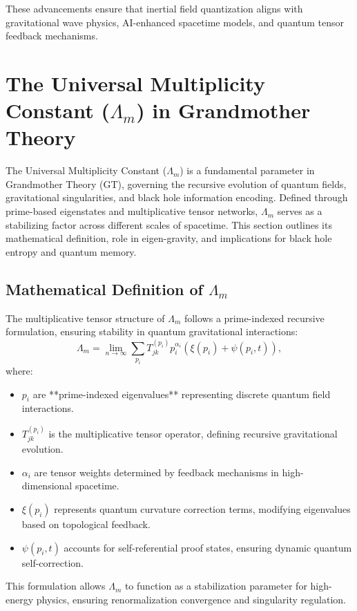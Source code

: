 \documentclass{article}
\theoremstyle{plain}
\begin{document}
These advancements ensure that inertial field quantization aligns with gravitational wave physics, AI-enhanced spacetime models, and quantum tensor feedback mechanisms.

\section{The Universal Multiplicity Constant ($\Lambda_m$) in Grandmother Theory}

The Universal Multiplicity Constant ($\Lambda_m$) is a fundamental parameter in Grandmother Theory (GT), governing the recursive evolution of quantum fields, gravitational singularities, and black hole information encoding. Defined through prime-based eigenstates and multiplicative tensor networks, $\Lambda_m$ serves as a stabilizing factor across different scales of spacetime. This section outlines its mathematical definition, role in eigen-gravity, and implications for black hole entropy and quantum memory.

\subsection{Mathematical Definition of $\Lambda_m$}
The multiplicative tensor structure of $\Lambda_m$ follows a prime-indexed recursive formulation, ensuring stability in quantum gravitational interactions:
\begin{equation}
    \Lambda_m = \lim_{n\to\infty} \sum_{p_i} T_{jk}^{(p_i)} p_i^{\alpha_i} (\xi(p_i) + \psi(p_i,t)),
\end{equation}
where:
\begin{itemize}
    \item $p_i$ are **prime-indexed eigenvalues** representing discrete quantum field interactions.
    \item $T_{jk}^{(p_i)}$ is the multiplicative tensor operator, defining recursive gravitational evolution.
    \item $\alpha_i$ are tensor weights determined by feedback mechanisms in high-dimensional spacetime.
    \item $\xi(p_i)$ represents quantum curvature correction terms, modifying eigenvalues based on topological feedback.
    \item $\psi(p_i,t)$ accounts for self-referential proof states, ensuring dynamic quantum self-correction.
\end{itemize}

This formulation allows $\Lambda_m$ to function as a stabilization parameter for high-energy physics, ensuring renormalization convergence and singularity regulation.
\end{document}
